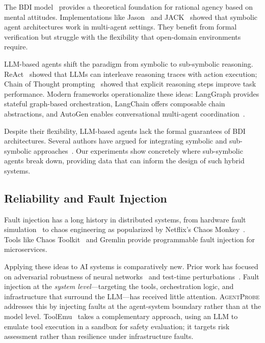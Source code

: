 \documentclass[make,article,submit,moreauthors,pdftex]{mdpi}
\providecommand{\agentprobe}{\textsc{AgentProbe}}
\begin{document}
The BDI model~\cite{rao1995bdi} provides a theoretical foundation for rational agency based on mental attitudes. Implementations like Jason~\cite{bordini2007programming} and JACK~\cite{winikoff2005jack} showed that symbolic agent architectures work in multi-agent settings. They benefit from formal verification but struggle with the flexibility that open-domain environments require.

LLM-based agents shift the paradigm from symbolic to sub-symbolic reasoning. ReAct~\cite{yao2023react} showed that LLMs can interleave reasoning traces with action execution; Chain of Thought prompting~\cite{wei2022chain} showed that explicit reasoning steps improve task performance. Modern frameworks operationalize these ideas: LangGraph provides stateful graph-based orchestration, LangChain offers composable chain abstractions, and AutoGen enables conversational multi-agent coordination~\cite{wu2023autogen}.

Despite their flexibility, LLM-based agents lack the formal guarantees of BDI architectures. Several authors have argued for integrating symbolic and sub-symbolic approaches~\cite{wooldridge2009introduction,garcez2023neurosymbolic}. Our experiments show concretely where sub-symbolic agents break down, providing data that can inform the design of such hybrid systems.

\subsection{Reliability and Fault Injection}

Fault injection has a long history in distributed systems, from hardware fault simulation~\cite{hsueh1997fault} to chaos engineering as popularized by Netflix's Chaos Monkey~\cite{basiri2016chaos}. Tools like Chaos Toolkit~\cite{chaostoolkit2024} and Gremlin provide programmable fault injection for microservices.

Applying these ideas to AI systems is comparatively new. Prior work has focused on adversarial robustness of neural networks~\cite{goodfellow2015explaining} and test-time perturbations~\cite{ribeiro2020beyond}. Fault injection at the \emph{system level}---targeting the tools, orchestration logic, and infrastructure that surround the LLM---has received little attention. \agentprobe{} addresses this by injecting faults at the agent-system boundary rather than at the model level. ToolEmu~\cite{ruan2024toolemu} takes a complementary approach, using an LLM to emulate tool execution in a sandbox for safety evaluation; it targets risk assessment rather than resilience under infrastructure faults.
\end{document}
